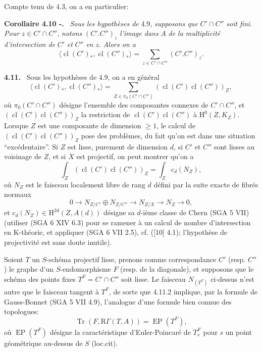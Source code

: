 \documentclass[11pt]{article}
\newenvironment{statement}[1]{\par\medskip\noindent\textbf{#1.}\ }{\par\medskip}
\renewcommand{\H}{\mathrm{H}}
\newcommand{\R}{\mathrm{R}}\newcommand{\RHomCore}{\mathrm{RHom}}
\providecommand{\cl}{\operatorname{cl}}
\providecommand{\Tr}{\operatorname{Tr}}
\providecommand{\EP}{\operatorname{EP}}
\providecommand{\Tr}{\operatorname{Tr}}
\providecommand{\Tr}{\operatorname{Tr}}
\providecommand{\R}{\mathrm R}
\providecommand{\Tr}{\operatorname{Tr}}
\providecommand{\cl}{\operatorname{cl}}
\providecommand{\EP}{\operatorname{EP}}
\providecommand{\cl}{\operatorname{cl}}
\providecommand{\Tr}{\operatorname{Tr}}
\begin{document}
Compte tenu de 4.3, on a en particulier:

\begin{statement}{Corollaire 4.10 -}
\emph{Sous les hypothèses de} 4.9, \emph{supposons que} $C'\cap C''$ \emph{soit fini}. \emph{Pour} $z\in C'\cap C''$, \emph{notons} $(C'.C'')_z$ \emph{l'image dans} $A$ \emph{de la multiplicité d'intersection de} $C'$ \emph{et} $C''$ \emph{en} $z$. \emph{Alors on a}
\[
\langle \cl(C')_*,\cl(C'')_*\rangle
=
\sum_{z\in C'\cap C''}(C'.C'')_z.
\]
\end{statement}

\begin{statement}{4.11}
Sous les hypothèses de 4.9, on a en général
\begin{equation}
\tag{4.11.1}
\langle \cl(C')_*,\cl(C'')_*\rangle
=
\sum_{Z\in\pi_0(C'\cap C'')}(\cl(C')\cl(C''))_Z,
\end{equation}
où $\pi_0(C'\cap C'')$ désigne l'ensemble des composantes connexes de $C'\cap C''$, et $(\cl(C')\cl(C''))_Z$ la restriction de $\cl(C')\cl(C'')$ à $\H^0(Z,K_Z)$. Lorsque $Z$ est une composante de dimension $\geq 1$, le calcul de $(\cl(C')\cl(C''))_Z$ pose des problèmes, du fait qu'on est dans une situation ``excédentaire''. Si $Z$ est lisse, purement de dimension $d$, si $C'$ et $C''$ sont lisses au voisinage de $Z$, et si $X$ est projectif, on peut montrer qu'on a
\begin{equation}
\tag{4.11.2}
\int_Z(\cl(C')\cl(C''))_Z=\int_Z c_d(N_Z),
\end{equation}
où $N_Z$ est le faisceau localement libre de rang $d$ défini par la suite exacte de fibrés normaux
\[
0\longrightarrow N_{Z/C'}\oplus N_{Z/C''}\longrightarrow N_{Z/X}\longrightarrow N_Z\longrightarrow 0,
\]
et $c_d(N_Z)\in \H^{2d}(Z,A(d))$ désigne sa $d$-ième classe de Chern (SGA 5 VII) (utiliser (SGA 6 XIV 6.3) pour se ramener à un calcul de nombre d'intersection en K-théorie, et appliquer (SGA 6 VII 2.5), cf. ([10] 4.1); l'hypothèse de projectivité est sans doute inutile).

Soient $T$ un $S$-schéma projectif lisse, prenons comme correspondance $C'$ (resp. $C''$) le graphe d'un $S$-endomorphisme $F$ (resp. de la diagonale), et supposons que le schéma des points fixes $T^F=C'\cap C''$ soit lisse. Le faisceau $N_{(T^F)}$ ci-dessus n'est autre que le faisceau tangent à $T^F$, de sorte que 4.11.2 implique, par la formule de Gauss-Bonnet (SGA 5 VII 4.9), l'analogue d'une formule bien connue des topologues:
\begin{equation}
\tag{4.11.3}
\Tr(F,\R\Gamma(T,A))=\EP(T^F),
\end{equation}
où $\EP(T^F)$ désigne la caractéristique d'Euler-Poincaré de $T_s^F$ pour $s$ un point géométrique au-dessus de $S$ (loc.cit).
\end{statement}
\end{document}

